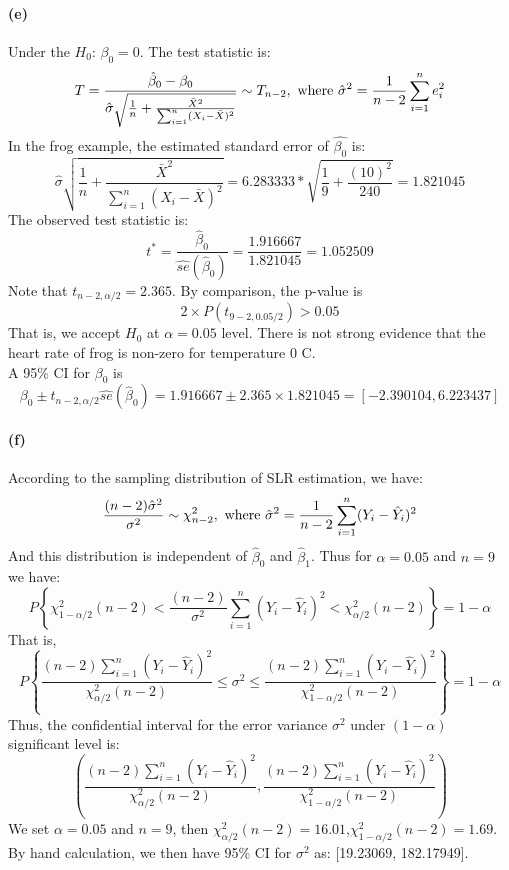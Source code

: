 \documentclass{article}
\begin{document}
\paragraph{(e)}
Under the $H_0$:  $\beta_0=0$. The test statistic is: 
$$T=\frac{\hat{\beta}_0-\beta_0}{\hat{\sigma}\sqrt{\frac{1}{n}+\frac{\bar{X}^2}{\sum_{i=1}^{n}(X_i-\bar{X})^2}}}\sim T_{n-2},\
\textup{where}\ \hat{\sigma}^2=\frac{1}{n-2}\sum_{i=1}^{n}e_i^2$$
In the frog example, the estimated standard error of $\hat{\beta_0}$  is:
$$\hat{\sigma}\sqrt{\frac{1}{n}+\frac{\bar{X}^2}{\sum_{i=1}^{n}(X_i-\bar{X})^2}}=6.283333*\sqrt{\frac{1}{9}+\frac{(10)^2}{240}}=1.821045$$
The observed test statistic is:
$$t^*=\frac{\hat{\beta}_0}{\hat{se}(\hat{\beta}_0)}=\frac{1.916667}{1.821045}=1.052509$$
Note that $t_{n-2,\alpha/2}=2.365$. By comparison, the p-value is
$$2\times P(t_{9-2,0.05/2})>0.05$$
That is, we accept $H_0$ at $\alpha=0.05$ level. There is not strong evidence that the heart rate of frog is non-zero for temperature 0 C.\\
A 95\% CI for $\beta_0$ is
$$\beta_0\pm t_{n-2,\alpha/2}\hat{se}(\hat{\beta}_0)=1.916667\pm2.365\times1.821045=[-2.390104,6.223437]$$

\paragraph{(f)}
According to the sampling distribution of SLR estimation, we have:
$$\frac{(n-2)\hat{\sigma}^2}{\sigma^2}\sim \chi_{n-2}^2,\
\textup{where}\ \hat{\sigma}^2=\frac{1}{n-2}\sum_{i=1}^n(Y_i-\hat{Y}_i)^2$$
And this distribution is independent of $\hat{\beta}_0$ and $\hat{\beta}_1$. Thus for $\alpha=0.05$ and $n=9$ we have:
$$P\left\{\chi_{1-\alpha/2}^2(n-2)<\frac{(n-2)}{\sigma^2}\sum_{i=1}^n(Y_i-\hat{Y}_i)^2<\chi_{\alpha/2}^2(n-2)\right\}=1-\alpha$$
That is,
$$P\left\{\frac{(n-2)\sum_{i=1}^n(Y_i-\hat{Y}_i)^2}{\chi_{\alpha/2}^2(n-2)}\leq\sigma^2\leq\frac{(n-2)\sum_{i=1}^n(Y_i-\hat{Y}_i)^2}{\chi_{1-\alpha/2}^2(n-2)}\right\}=1-\alpha$$
Thus, the confidential interval for the error variance $\sigma^2$ under $(1-\alpha)$ significant level is:
$$(\frac{(n-2)\sum_{i=1}^n(Y_i-\hat{Y}_i)^2}{\chi_{\alpha/2}^2(n-2)},\frac{(n-2)\sum_{i=1}^n(Y_i-\hat{Y}_i)^2}{\chi_{1-\alpha/2}^2(n-2)})$$
We set $\alpha=0.05$ and $n=9$, then $\chi_{\alpha/2}^2(n-2)=16.01$,$\chi_{1-\alpha/2}^2(n-2)=1.69$.
\\By hand calculation, we then have 95\% CI for $\sigma^2$ as: [19.23069, 182.17949].
\end{document}

